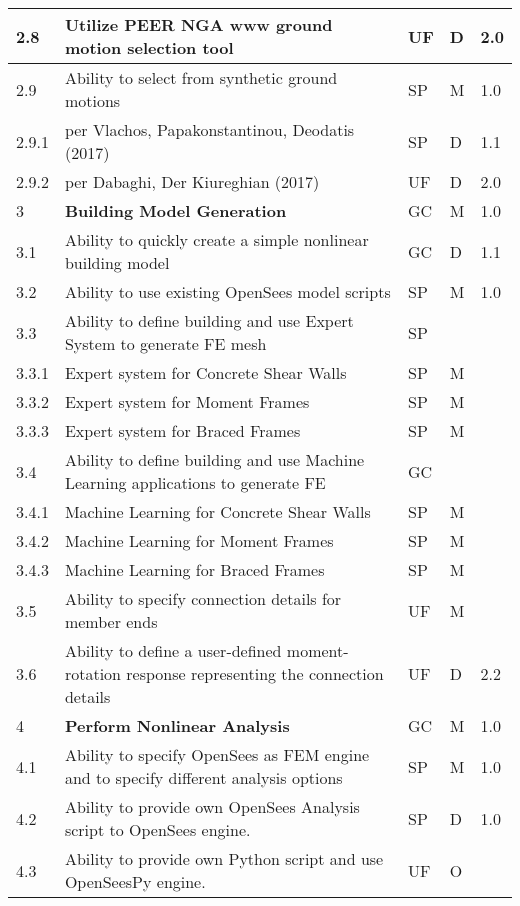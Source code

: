 \begin{longtable}{| p{} | p{} | p{} | p{} |  p{} |}
      2.8 & Utilize PEER NGA www ground motion selection tool  & UF & D & 2.0 \\ \hline
      2.9 & Ability to select from synthetic ground motions & SP & M & 1.0  \\
      2.9.1 & per Vlachos, Papakonstantinou, Deodatis (2017) & SP & D & 1.1  \\ 
      2.9.2 & per Dabaghi, Der Kiureghian (2017) & UF & D & 2.0 \\ \hline
  3 & \textbf{Building Model Generation} & GC & M & 1.0 \\ \hline
  3.1 & Ability to quickly create a simple nonlinear building model & GC & D & 1.1 \\ \hline
  3.2 & Ability to use existing OpenSees model scripts & SP & M & 1.0 \\ \hline
  3.3  & Ability to define building and use Expert System to generate FE mesh & SP & &  \\ \hline
  3.3.1 & Expert system for Concrete Shear Walls & SP & M &  \\ \hline
  3.3.2 & Expert system for Moment Frames & SP & M &  \\ \hline
  3.3.3 & Expert system for  Braced Frames & SP & M &   \\ \hline
  3.4 & Ability to define building and use Machine Learning applications to generate FE & GC &  &  \\ \hline
  3.4.1 & Machine Learning for Concrete Shear Walls & SP & M &  \\ \hline
  3.4.2 & Machine Learning for Moment Frames & SP & M &  \\ \hline
  3.4.3 & Machine Learning for Braced Frames & SP & M &   \\ \hline
  3.5 & Ability to specify connection details for member ends & UF & M &  \\ \hline
  3.6 & Ability to define a user-defined moment-rotation response representing the connection details & UF & D & 2.2 \\ \hline
  4 & \textbf{Perform Nonlinear Analysis} & GC & M & 1.0 \\ \hline
  4.1 & Ability to specify OpenSees as FEM engine and to specify different analysis options & SP & M & 1.0 \\ \hline
  4.2 & Ability to provide own OpenSees Analysis script to OpenSees engine. & SP & D & 1.0 \\ \hline
  4.3 & Ability to provide own Python script and use OpenSeesPy engine. & UF & O &  \\ \hline

\end{longtable}
